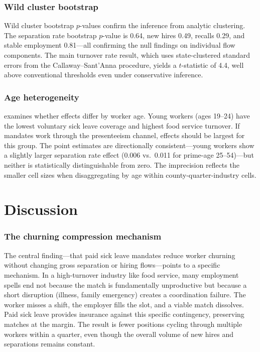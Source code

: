 \documentclass[12pt]{article}
\begin{document}
\subsubsection*{Wild cluster bootstrap} Wild cluster bootstrap $p$-values confirm the inference from analytic clustering. The separation rate bootstrap $p$-value is 0.64, new hires 0.49, recalls 0.29, and stable employment 0.81---all confirming the null findings on individual flow components. The main turnover rate result, which uses state-clustered standard errors from the Callaway--Sant'Anna procedure, yields a $t$-statistic of 4.4, well above conventional thresholds even under conservative inference.

\subsubsection*{Age heterogeneity}  examines whether effects differ by worker age. Young workers (ages 19--24) have the lowest voluntary sick leave coverage and highest food service turnover. If mandates work through the presenteeism channel, effects should be largest for this group. The point estimates are directionally consistent---young workers show a slightly larger separation rate effect (0.006 vs.\ 0.011 for prime-age 25--54)---but neither is statistically distinguishable from zero. The imprecision reflects the smaller cell sizes when disaggregating by age within county-quarter-industry cells.


\section{Discussion}\label{sec:discussion}

\subsubsection*{The churning compression mechanism} The central finding---that paid sick leave mandates reduce worker churning without changing gross separation or hiring flows---points to a specific mechanism. In a high-turnover industry like food service, many employment spells end not because the match is fundamentally unproductive but because a short disruption (illness, family emergency) creates a coordination failure. The worker misses a shift, the employer fills the slot, and a viable match dissolves. Paid sick leave provides insurance against this specific contingency, preserving matches at the margin. The result is fewer positions cycling through multiple workers within a quarter, even though the overall volume of new hires and separations remains constant.
\end{document}
